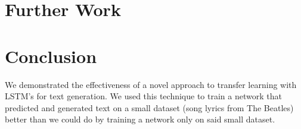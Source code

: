 \documentclass[10pt,twocolumn,letterpaper]{article}
\begin{document}
\section{Further Work}


\section{Conclusion}
	We demonstrated the effectiveness of a novel approach to transfer learning with LSTM's for text generation. We used this technique to train a network that predicted and generated text on a small dataset (song lyrics from The Beatles) better than we could do by training a network only on said small dataset.

{\small


}
\end{document}
